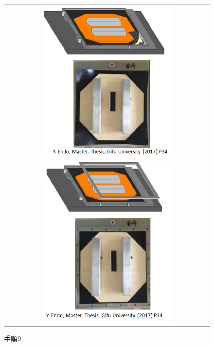 \documentclass[12pt,a4paper]{jarticle}
\begin{document}
\begin{figure}[htbp]
  \centering
      \begin{tabular}{c}
        \begin{minipage}{0.5\hsize}
          \centering
            \includegraphics[clip, width=70mm]{tezyun_8.png}
            \hspace{1.6cm} 
            \caption{手順8\label{fig:tezyun_8}}
        \end{minipage}
        
        \begin{minipage}{0.5\hsize}
          \centering
            \includegraphics[clip, width=70mm]{tezyun_9.png}
            \hspace{1.6cm} 
            \caption{手順9\label{fig:tezyun_9}}
        \end{minipage}
    
      \end{tabular}
\end{figure}
\end{document}
